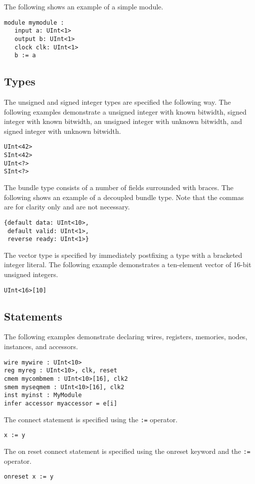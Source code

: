\documentclass[12pt]{article}
\begin{document}
The following shows an example of a simple module.
\begin{verbatim}
module mymodule :
   input a: UInt<1>
   output b: UInt<1>
   clock clk: UInt<1>
   b := a
\end{verbatim}

\subsection*{Types}
The unsigned and signed integer types are specified the following way.
The following examples demonstrate a unsigned integer with known bitwidth, signed integer with known bitwidth, an unsigned integer with unknown bitwidth, and signed integer with unknown bitwidth.
\begin{verbatim}
UInt<42>
SInt<42>
UInt<?>
SInt<?>
\end{verbatim}

The bundle type consists of a number of fields surrounded with braces.
The following shows an example of a decoupled bundle type.
Note that the commas are for clarity only and are not necessary.
\begin{verbatim}
{default data: UInt<10>,
 default valid: UInt<1>,
 reverse ready: UInt<1>} 
\end{verbatim}

The vector type is specified by immediately postfixing a type with a bracketed integer literal.
The following example demonstrates a ten-element vector of 16-bit unsigned integers.
\begin{verbatim}
UInt<16>[10]
\end{verbatim}

\subsection*{Statements}
The following examples demonstrate declaring wires, registers, memories, nodes, instances, and accessors.
\begin{verbatim}
wire mywire : UInt<10> 
reg myreg : UInt<10>, clk, reset 
cmem mycombmem : UInt<10>[16], clk2 
smem myseqmem : UInt<10>[16], clk2 
inst myinst : MyModule 
infer accessor myaccessor = e[i] 
\end{verbatim}

The connect statement is specified using the \verb|:=| operator.
\begin{verbatim}
x := y
\end{verbatim}

The on reset connect statement is specified using the onreset keyword and the \verb|:=| operator.
\begin{verbatim}
onreset x := y 
\end{verbatim}
\end{document}

